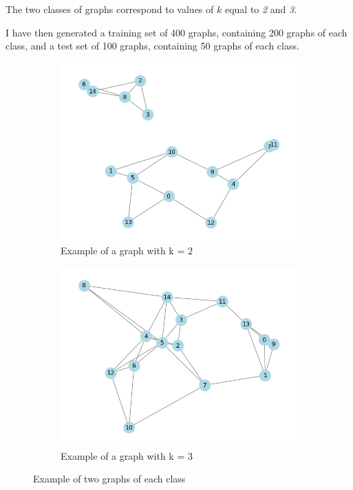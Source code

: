 \documentclass[a4paper,11pt]{article}
\begin{document}
The two classes of graphs correspond to values of $k$ equal to \textit{2} and \textit{3}.

I have then generated a training set of 400 graphs, containing 200 graphs of each class, and a test set of 100 graphs, containing 50 graphs of each class.\\

\begin{figure}[h]
    \centering
    \begin{subfigure}{0.4\textwidth}
        \includegraphics[width=\textwidth]{figures/graph_k2.png}
        \caption{Example of a graph with k = 2 }
    \end{subfigure}
    \begin{subfigure}{0.4\textwidth}
        \includegraphics[width=\textwidth]{figures/graph_k3.png}
        \caption{Example of a graph with k = 3}
    \end{subfigure}
    \caption{Example of two graphs of each class}
\end{figure} 
\end{document}

